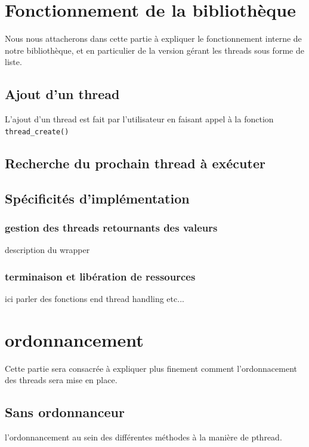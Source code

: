 \documentclass{article}
\begin{document}
	\section{Fonctionnement de la bibliothèque}
	Nous nous attacherons dans cette partie à expliquer le
    fonctionnement interne de notre bibliothèque, et en particulier
     de la version gérant les threads sous forme de
    liste.

		\subsection{Ajout d'un thread}
		L'ajout d'un thread est fait par l'utilisateur en faisant 
		appel à la fonction \verb!thread_create()!
		

		\subsection{Recherche du prochain thread à exécuter}

		\subsection{Spécificités d'implémentation}
		
			\subsubsection{gestion des threads retournants des valeurs}
			description du wrapper
			
			\subsubsection{terminaison et libération de ressources}
			ici parler des fonctions end thread handling etc...
		

	\section{ordonnancement}
	Cette partie sera consacrée à expliquer plus finement comment
    l'ordonnacement des threads sera mise en place.

		\subsection{Sans ordonnanceur}
		l'ordonnancement au sein des différentes méthodes à la manière
        de pthread.
\end{document}
